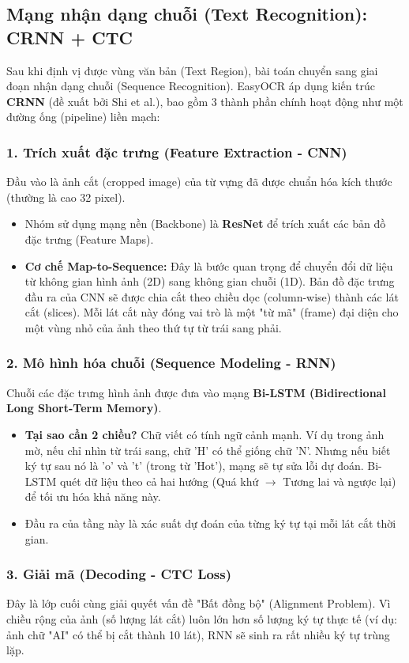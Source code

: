 \documentclass[6pt, a4paper]{report}
\begin{document}
	\subsection{Mạng nhận dạng chuỗi (Text Recognition): CRNN + CTC}
	Sau khi định vị được vùng văn bản (Text Region), bài toán chuyển sang giai đoạn nhận dạng chuỗi (Sequence Recognition). EasyOCR áp dụng kiến trúc \textbf{CRNN} (đề xuất bởi Shi et al.), bao gồm 3 thành phần chính hoạt động như một đường ống (pipeline) liền mạch:
	
	\subsubsection{1. Trích xuất đặc trưng (Feature Extraction - CNN)}
	Đầu vào là ảnh cắt (cropped image) của từ vựng đã được chuẩn hóa kích thước (thường là cao 32 pixel). 
	\begin{itemize}
		\item Nhóm sử dụng mạng nền (Backbone) là \textbf{ResNet} để trích xuất các bản đồ đặc trưng (Feature Maps).
		\item \textbf{Cơ chế Map-to-Sequence:} Đây là bước quan trọng để chuyển đổi dữ liệu từ không gian hình ảnh (2D) sang không gian chuỗi (1D). Bản đồ đặc trưng đầu ra của CNN sẽ được chia cắt theo chiều dọc (column-wise) thành các lát cắt (slices). Mỗi lát cắt này đóng vai trò là một "từ mã" (frame) đại diện cho một vùng nhỏ của ảnh theo thứ tự từ trái sang phải.
	\end{itemize}
	
	\subsubsection{2. Mô hình hóa chuỗi (Sequence Modeling - RNN)}
	Chuỗi các đặc trưng hình ảnh được đưa vào mạng \textbf{Bi-LSTM (Bidirectional Long Short-Term Memory)}.
	\begin{itemize}
		\item \textbf{Tại sao cần 2 chiều?} Chữ viết có tính ngữ cảnh mạnh. Ví dụ trong ảnh mờ, nếu chỉ nhìn từ trái sang, chữ 'H' có thể giống chữ 'N'. Nhưng nếu biết ký tự sau nó là 'o' và 't' (trong từ 'Hot'), mạng sẽ tự sửa lỗi dự đoán. Bi-LSTM quét dữ liệu theo cả hai hướng (Quá khứ $\rightarrow$ Tương lai và ngược lại) để tối ưu hóa khả năng này.
		\item Đầu ra của tầng này là xác suất dự đoán của từng ký tự tại mỗi lát cắt thời gian.
	\end{itemize}
	
	\subsubsection{3. Giải mã (Decoding - CTC Loss)}
	Đây là lớp cuối cùng giải quyết vấn đề "Bất đồng bộ" (Alignment Problem). Vì chiều rộng của ảnh (số lượng lát cắt) luôn lớn hơn số lượng ký tự thực tế (ví dụ: ảnh chữ "AI" có thể bị cắt thành 10 lát), RNN sẽ sinh ra rất nhiều ký tự trùng lặp.
	
\end{document}
